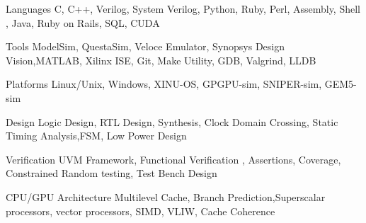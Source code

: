 

\begin{cvskills}

  \cvskill
    {Languages} %
    {C, C++, Verilog, System Verilog, Python, Ruby, Perl, Assembly, Shell , Java, Ruby on Rails, SQL, CUDA} %

  \cvskill
    {Tools} %
    {ModelSim, QuestaSim, Veloce Emulator, Synopsys Design Vision,MATLAB, Xilinx ISE, Git, Make Utility, GDB, Valgrind, LLDB} %

    \cvskill
    {Platforms} %
    {Linux/Unix, Windows, XINU-OS, GPGPU-sim, SNIPER-sim, GEM5-sim} %

  \cvskill
    {Design} %
    { Logic Design, RTL Design, Synthesis, Clock Domain Crossing, Static Timing Analysis,FSM, Low Power Design} %

  \cvskill
    {Verification} %
    {UVM Framework, Functional Verification , Assertions, Coverage, Constrained Random testing, Test Bench Design} %

  \cvskill
    {CPU/GPU Architecture} %
    {Multilevel Cache, Branch Prediction,Superscalar processors, vector processors, SIMD, VLIW, Cache Coherence} %

  

\end{cvskills}
